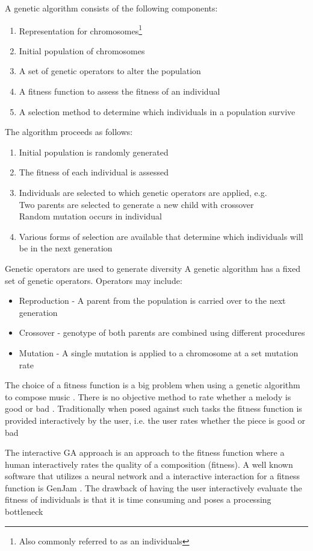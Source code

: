A genetic algorithm consists of the following components:
\begin{enumerate}
\item Representation for chromosomes\footnote{Also commonly referred to as an individuals}
\item Initial population of chromosomes
\item A set of genetic operators to alter the population
\item A fitness function to assess the fitness of an individual
\item A selection method to determine which individuals in a population survive
\end{enumerate}
The algorithm proceeds as follows:
\begin{enumerate}
\item Initial population is randomly generated
\item The fitness of each individual is assessed
\item Individuals are selected to which genetic operators are applied, e.g.
\\Two parents are selected to generate a new child with crossover
\\Random mutation occurs in individual
\item Various forms of selection are available that determine which individuals will be in the next generation
\end{enumerate}

Genetic operators are used to generate diversity A genetic algorithm has a fixed set of genetic operators. Operators may include:
\begin{itemize}
\item Reproduction - A parent from the population is carried over to the next generation
\item Crossover - genotype of both parents are combined using different procedures
\item Mutation - A single mutation is applied to a chromosome at a set mutation rate
\end{itemize}

The choice of a fitness function is a big problem when using a genetic algorithm to compose music \cite{Wiggins1998,Matic2010}. There is no objective method to rate whether a melody is good or bad \cite{Lo2012}. 
Traditionally when posed against such tasks the fitness function is provided interactively by the user, i.e. the user rates whether the piece is good or bad

The interactive GA approach is an approach to the fitness function where a human interactively rates the quality of a composition (fitness). A well known software that utilizes a neural network and a interactive interaction for a fitness function is GenJam \cite{Biles1996}. The drawback of having the user interactively evaluate the fitness of individuals is that it is time consuming and poses a processing bottleneck \cite{Eck2002}


